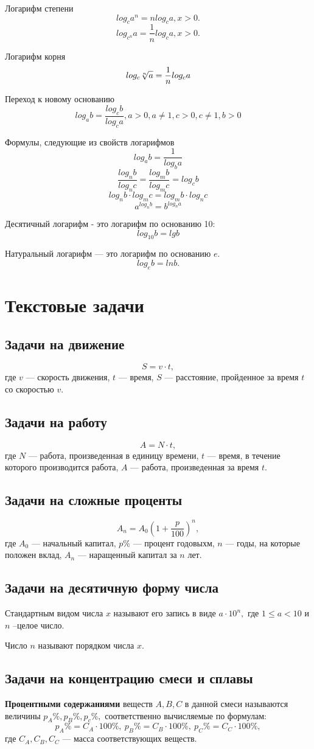 \documentclass[a4paper, 12pt]{article}
\begin{document}
Логарифм степени
$$log_ca^n=nlog_ca, x>0.$$
$$log_{c^n}a=\frac{1}{n}log_ca, x>0.$$

Логарифм корня
$$log_c \root{n}\of{a}=\frac{1}{n}log_ca$$

Переход к новому основанию
$$log_ab=\frac{log_cb}{log_ca}, a>0, a\not=1, c>0, c\not=1, b>0$$

Формулы, следующие из свойств логарифмов
$$log_ab=\frac{1}{log_ba}$$
$$\frac{log_nb}{log_nc}=\frac{log_mb}{log_mc}=log_cb$$
$$log_nb\cdot log_mc=log_mb\cdot log_nc$$
$$a^{log_nb}=b^{log_na}$$

Десятичный логарифм - это логарифм по основанию 10:
$$log_{10}b=lgb$$

Натуральный логарифм --- это логарифм по основанию $e.$
$$log_eb=ln b.$$

\section{Текстовые задачи}
\subsection{Задачи на движение}
$$S=v\cdot t,$$
где $v$ --- скорость движения, $t$ --- время, $S$ --- расстояние, пройденное за время $t$ со скоростью $v.$
\subsection{Задачи на работу}
$$A=N\cdot t,$$
где $N$ --- работа, произведенная в единицу времени, $t$ --- время, в течение которого производится работа, $A$ --- работа, произведенная за время $t.$
\subsection{Задачи на сложные проценты}
$$A_n=A_0\left( 1+\frac{p}{100}\right)^n ,$$
где $A_0$ --- начальный капитал, $p\%$ --- процент годовыхм, $n$ --- годы, на которые положен вклад, $A_n$ --- наращенный капитал за $n$ лет. 
\subsection{Задачи на десятичную форму числа}
Стандартным видом числа $x$ называют его запись в виде $a\cdot 10^n,$ где $1\le a < 10$ и $n$ --целое число.

Число $n$ называют порядком числа $x.$ 

\subsection{Задачи на концентрацию смеси и сплавы}
\textbf{Процентными содержаниями} веществ $A, B, C$ в данной смеси называются величины $p_A\%, p_B\%, p_c\%,$ соответственно вычисляемые по формулам:
$$
p_A\%=C_A\cdot 100\%,\  p_B\%=C_B\cdot 100\%,\ p_C\%=C_C\cdot 100\%,
$$
где $C_A, C_B, C_C$ --- масса соответствующих веществ.
\end{document}
